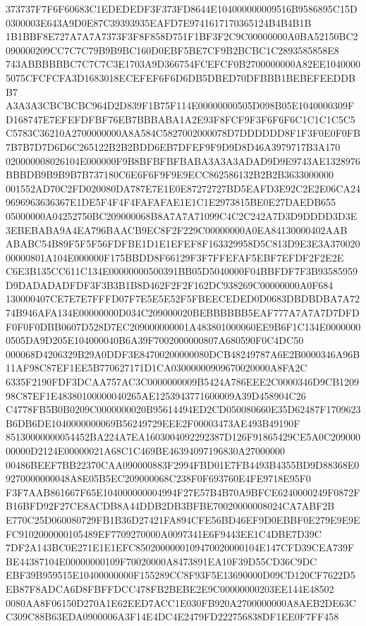 \documentclass[UTF8,fontset=fandol,zihao=-4,a4paper]{ctexart}
\begin{document}
{{373737F7F6F60683C1EDEDEDF3F373FD8644E104000000009516B9586895C15D0300003E643A9D0E87C39393935EAFD7E9741617170365124B4B4B1B
1B1BBF8E727A7A7A7373F3F8F858D751F1BF3F2C9C00000000A0BA52150BC2090000209CC7C7C79B9B9BC160D0EBF5BE7CF9B2BCBC1C2893585858E8
743ABBBBBBC7C7C7C3E1703A9D366754FCEFCF0B2700000000A82EE10400005075CFCFCFA3D1683018ECEFEF6F6D6DB5DBED70DFBBB1BEBEFEEDDBB7
A3A3A3CBCBCBC964D2D839F1B75F114E00000000505D098B05E1040000309FD168747E7EFEFDFBF76EB7BBBABA1A2E93F8FCF9F3F6F6F6C1C1C1C5C5
C5783C36210A2700000000A8A584C5827002000078D7DDDDDD8F1F3F0E0F0FB7B7B7D7D6D6C265122B2B2BDD6EB7DFEF9F9D9D8D46A3979717B3A170
020000008026104E000000F9B8BFBFBFBABA3A3A3ADAD9D9E9743AE1328976BBBDB9B9B9B7B737180C6E6F6F9F9E9ECC862586132B2B2B3633000000
001552AD70C2FD020080DA787E7E1E0E87272727BD5EAFD3E92C2E2E06CA249696963636367E1DE5F4F4F4FAFAFAE1E1C1E2973815BE0E27DAEDB655
05000000A04252750BC209000068B8A7A7A71099C4C2C242A7D3D9DDDD3D3E3EBEBABA9A4EA796BAACB9EC8F2F229C00000000A0EA84130000402AAB
ABABC54B89F5F5F56FDFBE1D1E1EFEF8F163329958D5C813D9E3E3A37002000000801A104E000000F175BBDD8F66129F3F7FFEFAF5EBF7EFDF2F2E2E
C6E3B135CC611C134E00000000500391BB05D5040000F04BBFDF7F3B93585959D9DADADADFDF3F3B3B1B8D462F2F2F162DC938269C00000000A0F684
130000407CE7E7E7FFFD07F7E5E5E52F5FBEECEDED0D0683DBDBDBA7A7274B946AFA134E00000000D034C209000020BEBBBBBB5EAF777A7A7A7D7DFD
F0F0F0DBB0607D528D7EC209000000001A483801000060EE9B6F1C134E00000000505DA9D205E104000040B6A39F7002000000807A680590F0C4DC50
000068D4206329B29A0DDF3E84700200000080DCB48249787A6E2B0000346A96B11AF98C87EF1EE5B770627171D1CA03000000909670020000A8FA2C
6335F2190FDF3DCAA757AC3C0000000009B5424A786EEE2C0000346D9CB120998C87EF1E48380100000040265AE1253943771600009A39D458904C26
C4778FB5B0B0209C0000000020B95614494ED2CD050080660E35D62487F1709623B6DB6DE1040000000069B56249729EEE2F00003473AE493B49190F
85130000000054452BA224A7EA1603004092292387D126F91865429CE5A0C20900000000D2124E00000021A68C1C469BE46394097196830A27000000
00486BEEF7BB22370CAA090000883F2994FBD01E7FB4493B4355BD9D88368E09270000000048A8E05B5EC209000068C238F0F693760E4FE9718E95F0
F3F7AAB861667F65E104000000004994F27E57B4B70A9BFCE6240000249F0872FB16BFD92F27CE8ACDB8A44DDB2DB3BFBE70020000008024CA7ABF2B
E770C25D060080729FB1B36D27421FA894CFE56BD46EF9D0EBBF0E279E9E9EFC9102000000105489EF7709270000A0097341E6F9443EE1C4DBE7D39C
7DF2A143BC0E271E1E1EFC8502000000109470020000104E147CFD39CEA739FBE44387104E00000000109F70020000A8473891EA10F39D55CD36C9DC
EBF39B959515E10400000000F155289CC8F93F5E13690000D09CD120CF7622D5EB87F8ADCA6D8FBFFDCC478FB2BEBE2E9C00000000203EE144E48502
0080AA8F06150D270A1E62EED7ACC1E030FB920A2700000000A8AEB2DE63CC309C88B63EDA0900006A3F14E4DC4E2479FD222756838DF1EE0F7FF458
}}
\end{document}

